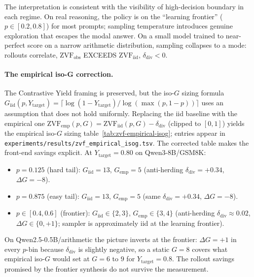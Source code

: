 The interpretation is consistent with the visibility of high-decision
boundary in each regime. On real reasoning, the policy is on the
``learning frontier'' ($p \in [0.2, 0.8]$) for most prompts; sampling
temperature introduces genuine exploration that escapes the modal
answer. On a small model trained to near-perfect score on a narrow
arithmetic distribution, sampling collapses to a mode: rollouts
correlate, $\mathrm{ZVF}_{\mathrm{obs}}$ EXCEEDS $\mathrm{ZVF}_{\mathrm{iid}}$,
$\delta_{\mathrm{div}} < 0$.

\paragraph{The empirical iso-G correction.}
The Contrastive Yield framing is preserved, but the iso-$G$ sizing
formula $G_{\mathrm{iid}}(p, Y_{\mathrm{target}}) = \lceil \log(1 - Y_{\mathrm{target}}) /
\log(\max(p, 1 - p)) \rceil$ uses an assumption that does not hold
uniformly. Replacing the iid baseline with the empirical one
$\mathrm{ZVF}_{\mathrm{emp}}(p, G) = \mathrm{ZVF}_{\mathrm{iid}}(p, G) -
\delta_{\mathrm{div}}$ (clipped to $[0, 1]$) yields the empirical
iso-$G$ sizing table~\ref{tab:zvf-empirical-isog}; entries appear in
\texttt{experiments/results/zvf\_empirical\_isog.tsv}. The corrected
table makes the front-end savings explicit. At
$Y_{\mathrm{target}} = 0.80$ on Qwen3-8B/GSM8K:
\begin{itemize}
\item $p = 0.125$ (hard tail): $G_{\mathrm{iid}} = 13$,
      $G_{\mathrm{emp}} = 5$ (anti-herding $\delta_{\mathrm{div}} = +0.34$, $\Delta G = -8$).
\item $p = 0.875$ (easy tail): $G_{\mathrm{iid}} = 13$,
      $G_{\mathrm{emp}} = 5$ (same $\delta_{\mathrm{div}} = +0.34$, $\Delta G = -8$).
\item $p \in [0.4, 0.6]$ (frontier): $G_{\mathrm{iid}} \in \{2, 3\}$,
      $G_{\mathrm{emp}} \in \{3, 4\}$ (anti-herding $\delta_{\mathrm{div}} \approx 0.02$, $\Delta G \in \{0, +1\}$; sampler is approximately iid at the learning frontier).
\end{itemize}
On Qwen2.5-0.5B/arithmetic the picture inverts at the frontier:
$\Delta G = +1$ in every $p$-bin because $\delta_{\mathrm{div}}$ is
slightly negative, so a static $G = 8$ covers what empirical iso-$G$
would set at $G = 6$ to $9$ for $Y_{\mathrm{target}} = 0.8$. The
rollout savings promised by the frontier synthesis do not survive the
measurement.

